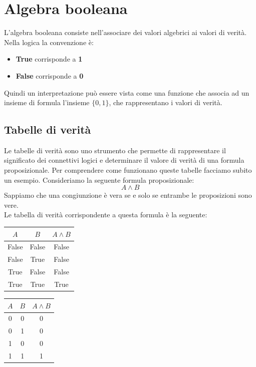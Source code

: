 \section{Algebra booleana}
L'algebra booleana consiste nell'associare dei valori algebrici ai valori di verità. Nella logica la convenzione è:
\begin{itemize}
    \item \textbf{True} corrisponde a \textbf{1}
    \item \textbf{False} corrisponde a \textbf{0}
\end{itemize}
Quindi un interpretazione può essere vista come una funzione che associa ad un insieme di formula l'insieme $\{0,1\}$, che rappresentano i valori di verità. 


\subsection{Tabelle di verità}
Le tabelle di verità sono uno strumento che permette di rappresentare il significato dei connettivi logici e determinare il valore di verità di una formula proposizionale. Per comprendere come funzionano queste tabelle
facciamo subito un esempio. Consideriamo la seguente formula proposizionale:
\[   A \wedge B        \]
Sappiamo che una congiunzione è vera se e solo se entrambe le proposizioni sono vere.\\
Le tabella di verità corrispondente a questa formula è la seguente:
\begin{center}
    \begin{tabular}{|c|c||c|}
        \hline
        $A$ & $B$ & $A \land B$ \\
        \hline \hline
        False & False & False \\
        False & True  & False \\
        True  & False & False \\
        True  & True  & True \\
        \hline
    \end{tabular}
    \qquad \qquad %
    \begin{tabular}{|c|c||c|}
        \hline
        $A$ & $B$ & $A \land B$ \\
        \hline \hline
        0 & 0 & 0 \\
        0 & 1 & 0 \\
        1 & 0 & 0 \\
        1 & 1 & 1 \\
        \hline
    \end{tabular}
\end{center}
